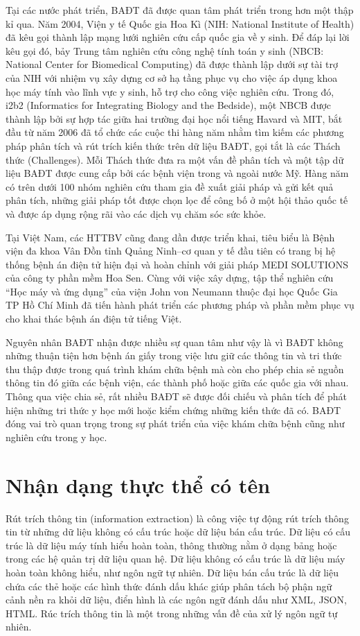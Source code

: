 Tại các nước phát triển, BAĐT đã được quan tâm phát triển trong hơn một thập kỉ qua. Năm 2004, Viện y tế Quốc gia Hoa Kì (NIH: National Institute of Health) đã kêu gọi thành lập mạng lưới nghiên cứu cấp quốc gia về y sinh. Để đáp lại lời kêu gọi đó, bảy Trung tâm nghiên cứu công nghệ tính toán y sinh (NBCB: National Center for Biomedical Computing) đã được thành lập dưới sự tài trợ của NIH với nhiệm vụ xây dựng cơ sở hạ tầng phục vụ cho việc áp dụng khoa học máy tính vào lĩnh vực y sinh, hỗ trợ cho công việc nghiên cứu. Trong đó, i2b2 (Informatics for Integrating Biology and the Bedside), một NBCB được thành lập bởi sự hợp tác giữa hai trường đại học nổi tiếng Havard và MIT, bắt đầu từ năm 2006 đã tổ chức các cuộc thi hàng năm nhằm tìm kiếm các phương pháp phân tích và rút trích kiến thức trên dữ liệu BAĐT, gọi tắt là các Thách thức (Challenges). Mỗi Thách thức đưa ra một vấn đề phân tích và một tập dữ liệu BAĐT được cung cấp bởi các bệnh viện trong và ngoài nước Mỹ. Hàng năm có trên dưới 100 nhóm nghiên cứu tham gia đề xuất giải pháp và gửi kết quả phân tích, những giải pháp tốt được chọn lọc để công bố ở một hội thảo quốc tế và được áp dụng rộng rãi vào các dịch vụ chăm sóc sức khỏe.

Tại Việt Nam, các HTTBV cũng đang dần được triển khai, tiêu biểu là Bệnh viện đa khoa Vân Đồn tỉnh Quảng Ninh--cơ quan y tế đầu tiên có trang bị hệ thống bệnh án điện tử hiện đại và hoàn chỉnh với giải pháp MEDI SOLUTIONS của công ty phần mềm Hoa Sen. Cùng với việc xây dựng, tập thể nghiên cứu ``Học máy và ứng dụng'' của viện John von Neumann thuộc đại học Quốc Gia TP Hồ Chí Minh đã tiến hành phát triển các phương pháp và phần mềm phục vụ cho khai thác bệnh án điện tử tiếng Việt.

Nguyên nhân BAĐT nhận được nhiều sự quan tâm như vậy là vì BAĐT không những thuận tiện hơn bệnh án giấy trong việc lưu giữ các thông tin và tri thức thu thập được trong quá trình khám chữa bệnh mà còn cho phép chia sẻ nguồn thông tin đó giữa các bệnh viện, các thành phố hoặc giữa các quốc gia với nhau. Thông qua việc chia sẻ, rất nhiều BAĐT sẽ được đối chiếu và phân tích để phát hiện những tri thức y học mới hoặc kiểm chứng những kiến thức đã có. BAĐT đóng vai trò quan trọng trong sự phát triển của việc khám chữa bệnh cũng như nghiên cứu trong y học.

\section{Nhận dạng thực thể có tên}
Rút trích thông tin (information extraction) là công việc tự động rút trích thông tin từ những dữ liệu không có cấu trúc hoặc dữ liệu bán cấu trúc. Dữ liệu có cấu trúc là dữ liệu máy tính hiểu hoàn toàn, thông thường nằm ở dạng bảng hoặc trong các hệ quản trị dữ liệu quan hệ. Dữ liệu không có cấu trúc là dữ liệu máy hoàn toàn không hiểu, như ngôn ngữ tự nhiên. Dữ liệu bán cấu trúc là dữ liệu chứa các thẻ hoặc các hình thức đánh dấu khác giúp phân tách bộ phận ngữ cảnh nền ra khỏi dữ liệu, điển hình là các ngôn ngữ đánh dấu như XML, JSON, HTML. Rúc trích thông tin là một trong những vấn đề của xử lý ngôn ngữ tự nhiên.

